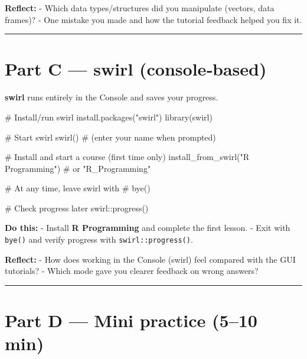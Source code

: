 \documentclass[
  letterpaper,
  DIV=11,
  numbers=noendperiod]{scrreprt}
\newenvironment{Shaded}{\begin{snugshade}}{\end{snugshade}}
\newcommand{\CommentTok}[1]{\textcolor[rgb]{0.37,0.37,0.37}{#1}}
\newcommand{\FunctionTok}[1]{\textcolor[rgb]{0.28,0.35,0.67}{#1}}
\newcommand{\NormalTok}[1]{\textcolor[rgb]{0.00,0.23,0.31}{#1}}
\newcommand{\SpecialCharTok}[1]{\textcolor[rgb]{0.37,0.37,0.37}{#1}}
\newcommand{\StringTok}[1]{\textcolor[rgb]{0.13,0.47,0.30}{#1}}
\begin{document}
\textbf{Reflect:} - Which data types/structures did you manipulate
(vectors, data frames)? - One mistake you made and how the tutorial
feedback helped you fix it.

\begin{center}\rule{0.5\linewidth}{0.5pt}\end{center}

\section{Part C --- swirl
(console‑based)}\label{part-c-swirl-consolebased}

\textbf{swirl} runs entirely in the Console and saves your progress.

\begin{Shaded}
\begin{Highlighting}[]
\CommentTok{\# Install/run swirl}
\FunctionTok{install.packages}\NormalTok{(}\StringTok{"swirl"}\NormalTok{)}
\FunctionTok{library}\NormalTok{(swirl)}

\CommentTok{\# Start swirl}
\FunctionTok{swirl}\NormalTok{()}
\CommentTok{\# (enter your name when prompted)}

\CommentTok{\# Install and start a course (first time only)}
\FunctionTok{install\_from\_swirl}\NormalTok{(}\StringTok{"R Programming"}\NormalTok{)   }\CommentTok{\# or "R\_Programming"}

\CommentTok{\# At any time, leave swirl with}
\CommentTok{\# bye()}

\CommentTok{\# Check progress later}
\NormalTok{swirl}\SpecialCharTok{::}\FunctionTok{progress}\NormalTok{()}
\end{Highlighting}
\end{Shaded}

\textbf{Do this:} - Install \textbf{R Programming} and complete the
first lesson. - Exit with \texttt{bye()} and verify progress with
\texttt{swirl::progress()}.

\textbf{Reflect:} - How does working in the Console (swirl) feel
compared with the GUI tutorials? - Which mode gave you clearer feedback
on wrong answers?

\begin{center}\rule{0.5\linewidth}{0.5pt}\end{center}

\section{Part D --- Mini practice (5--10
min)}\label{part-d-mini-practice-510-min}
\end{document}
